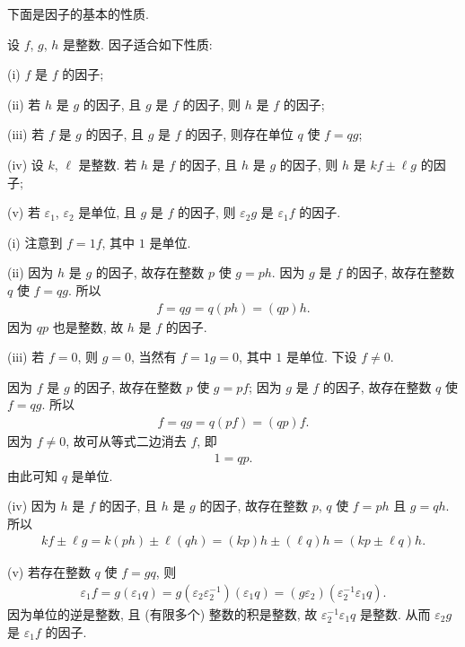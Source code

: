 下面是因子的基本的性质.

\begin{proposition}
    设 $f$, $g$, $h$ 是整数. 因子适合如下性质:

    (i) $f$ 是 $f$ 的因子;

    (ii) 若 $h$ 是 $g$ 的因子, 且 $g$ 是 $f$ 的因子, 则 $h$ 是 $f$ 的因子;

    (iii) 若 $f$ 是 $g$ 的因子, 且 $g$ 是 $f$ 的因子, 则存在单位 $q$ 使 $f = qg$;

    (iv) 设 $k$, $\ell$ 是整数. 若 $h$ 是 $f$ 的因子, 且 $h$ 是 $g$ 的因子, 则 $h$ 是 $kf \pm \ell g$ 的因子;

    (v) 若 $\varepsilon_1$, $\varepsilon_2$ 是单位, 且 $g$ 是 $f$ 的因子, 则 $\varepsilon_2 g$ 是 $\varepsilon_1 f$ 的因子.
\end{proposition}

\begin{pf}
    (i) 注意到 $f = 1f$, 其中 $1$ 是单位.

    (ii) 因为 $h$ 是 $g$ 的因子, 故存在整数 $p$ 使 $g = ph$. 因为 $g$ 是 $f$ 的因子, 故存在整数 $q$ 使 $f = qg$. 所以
    \begin{align*}
        f = qg = q(ph) = (qp)h.
    \end{align*}
    因为 $qp$ 也是整数, 故 $h$ 是 $f$ 的因子.

    (iii) 若 $f = 0$, 则 $g = 0$, 当然有 $f = 1 g = 0$, 其中 $1$ 是单位. 下设 $f \neq 0$.

    因为 $f$ 是 $g$ 的因子, 故存在整数 $p$ 使 $g = pf$; 因为 $g$ 是 $f$ 的因子, 故存在整数 $q$ 使 $f = qg$. 所以
    \begin{align*}
        f = qg = q(pf) = (qp)f.
    \end{align*}
    因为 $f \neq 0$, 故可从等式二边消去 $f$, 即
    \begin{align*}
        1 = qp.
    \end{align*}
    由此可知 $q$ 是单位.

    (iv) 因为 $h$ 是 $f$ 的因子, 且 $h$ 是 $g$ 的因子, 故存在整数 $p$, $q$ 使 $f = ph$ 且 $g = qh$. 所以
    \begin{align*}
        kf \pm \ell g = k(ph) \pm \ell (qh) = (kp) h \pm (\ell q) h = (kp \pm \ell q) h.
    \end{align*}

    (v) 若存在整数 $q$ 使 $f = gq$, 则
    \begin{align*}
        \varepsilon_1 f = g(\varepsilon_1 q) = g(\varepsilon_2 \varepsilon_2^{-1}) (\varepsilon_1 q) = (g\varepsilon_2) (\varepsilon_2^{-1} \varepsilon_1 q).
    \end{align*}
    因为单位的逆是整数, 且 (有限多个) 整数的积是整数, 故 $\varepsilon_2^{-1} \varepsilon_1 q$ 是整数. 从而 $\varepsilon_2 g$ 是 $\varepsilon_1 f$ 的因子.
\end{pf}

